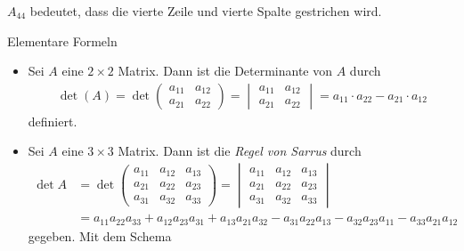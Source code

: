 $A_{44}$ bedeutet, dass die vierte Zeile und vierte Spalte gestrichen wird.\\
\begin{mybox}{Elementare Formeln}
\begin{itemize}
\item
Sei $A$ eine $2 \times 2$ Matrix.
Dann ist die Determinante von $A$ durch
\begin{align*}
\det(A)= \det 
\begin{pmatrix}
a_{11} & a_{12}\\
a_{21} & a_{22}
\end{pmatrix} 
= 
\begin{vmatrix}
a_{11} & a_{12}\\
a_{21} & a_{22}
\end{vmatrix}
=
a_{11} \cdot a_{22} - a_{21} \cdot a_{12}
\end{align*}
definiert.
\item
Sei $A$ eine $3 \times 3$ Matrix.
Dann ist die \textit{Regel von Sarrus} durch
\begin{align*}
\det A
&=
\det
\begin{pmatrix}
a_{11} & a_{12} & a_{13}\\
a_{21} & a_{22} & a_{23}\\
a_{31} & a_{32} & a_{33}
\end{pmatrix}
= 
\begin{vmatrix}
a_{11} & a_{12} & a_{13}\\
a_{21} & a_{22} & a_{23}\\
a_{31} & a_{32} & a_{33}
\end{vmatrix}\\
&=
a_{11}a_{22}a_{33}
+
a_{12}a_{23}a_{31}
+
a_{13}a_{21}a_{32}
-
a_{31}a_{22}a_{13}
-
a_{32}a_{23}a_{11}
-
a_{33}a_{21}a_{12}
\end{align*}
gegeben.
Mit dem Schema
\begin{center}
\end{center}
\end{itemize}
\end{mybox}
